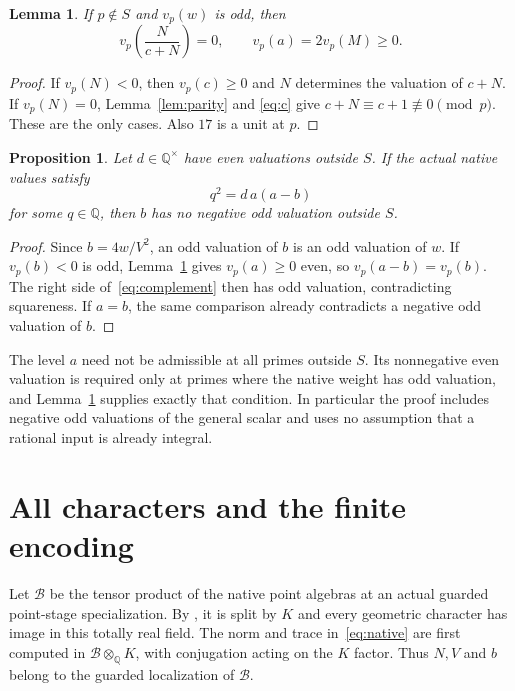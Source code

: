 \documentclass[11pt,a4paper]{article}
\newtheorem{lemma}[theorem]{Lemma}
\newtheorem{proposition}[theorem]{Proposition}
\newcommand{\Q}{\mathbb Q}\newcommand{\Z}{\mathbb Z}
\begin{document}
\begin{lemma}\label{lem:unit}
If $p\notin S$ and $v_p(w)$ is odd, then
\[
                   v_p\left(\frac{N}{c+N}\right)=0,
                   \qquad v_p(a)=2v_p(M)\ge0.
\]
\end{lemma}
\begin{proof}
If $v_p(N)<0$, then $v_p(c)\ge0$ and $N$ determines the valuation
of $c+N$. If $v_p(N)=0$, Lemma~\ref{lem:parity} and
\eqref{eq:c} give $c+N\equiv c+1\not\equiv0\pmod p$.
These are the only cases. Also $17$ is a unit at $p$.
\end{proof}

\begin{proposition}\label{prop:local}
Let $d\in\Q^\times$ have even valuations outside $S$.
If the actual native values satisfy
\begin{equation}\label{eq:complement}
                                q^2=d\,a(a-b)
\end{equation}
for some $q\in\Q$, then $b$ has no negative odd valuation
outside $S$.
\end{proposition}
\begin{proof}
Since $b=4w/V^2$, an odd valuation of $b$ is an odd valuation
of $w$. If $v_p(b)<0$ is odd, Lemma~\ref{lem:unit} gives
$v_p(a)\ge0$ even, so $v_p(a-b)=v_p(b)$.
The right side of~\eqref{eq:complement} then has odd valuation,
contradicting squareness. If $a=b$, the same comparison already
contradicts a negative odd valuation of $b$.
\end{proof}

The level $a$ need not be admissible at all primes outside $S$.
Its nonnegative even valuation is required only at primes where the
native weight has odd valuation, and Lemma~\ref{lem:unit} supplies
exactly that condition. In particular the proof includes negative
odd valuations of the general scalar and uses no assumption that
a rational input is already integral.

\section{All characters and the finite encoding}

Let $\mathcal B$ be the tensor product of the native point algebras
at an actual guarded point-stage specialization. By
\cite[Lemma~1.1]{Complements}, it is split by $K$ and every geometric
character has image in this totally real field.
The norm and trace in~\eqref{eq:native} are first computed in
$\mathcal B\otimes_\Q K$, with conjugation acting on the $K$ factor.
Thus $N,V$ and $b$ belong to the guarded localization of $\mathcal B$.
\end{document}
